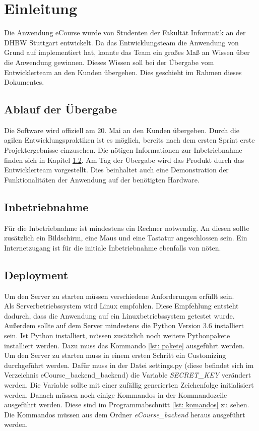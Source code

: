 
\chapter{Einleitung}

Die Anwendung eCourse wurde von Studenten der Fakultät Informatik an der DHBW Stuttgart entwickelt. Da das Entwicklungsteam die Anwendung von Grund auf implementiert hat, konnte das Team ein großes Maß an Wissen über die Anwendung gewinnen. Dieses Wissen soll bei der Übergabe vom Entwicklerteam an den Kunden übergehen. Dies geschieht im Rahmen dieses Dokumentes. 

\section{Ablauf der Übergabe}
Die Software wird offiziell am 20. Mai an den Kunden übergeben. Durch die agilen Entwicklungspraktiken ist es möglich, bereits nach dem ersten Sprint erste Projektergebnisse einzusehen. Die nötigen Informationen zur Inbetriebnahme finden sich in Kapitel \ref{sec:inbetrieb}.
Am Tag der Übergabe wird das Produkt durch das Entwicklerteam vorgestellt. Dies beinhaltet auch eine Demonstration der Funktionalitäten der Anwendung auf der benötigten Hardware.

\section{Inbetriebnahme}
\label{sec:inbetrieb}
Für die Inbetriebnahme ist mindestens ein Rechner notwendig. An diesen sollte zusätzlich ein Bildschirm, eine Maus und eine Tastatur angeschlossen sein. Ein Internetzugang ist für die initiale Inbetriebnahme ebenfalls von nöten.

\section{Deployment}
Um den Server zu starten müssen verschiedene Anforderungen erfüllt sein. \\
Als Serverbetriebssystem wird Linux empfohlen. Diese Empfehlung entsteht dadurch, dass die Anwendung auf ein Linuxbetriebssystem getestet wurde.
Außerdem sollte auf dem Server mindestens die Python Version 3.6 installiert sein. Ist Python installiert, müssen zusätzlich noch weitere Pythonpakete installiert werden. Dazu muss das Kommando \ref{lst: pakete} ausgeführt werden. 
Um den Server zu starten muss in einem ersten Schritt ein Customizing durchgeführt werden. Dafür muss in der Datei \glqq settings.py\grqq\; (diese befindet sich im Verzeichnis \glqq eCourse\_backend\eCourse\_backend\grqq ) die Variable \textit{SECRET\_KEY} verändert werden. Die Variable sollte mit einer zufällig generierten Zeichenfolge initialisiert werden. 
Danach müssen noch einige Kommandos in der Kommandozeile ausgeführt werden. Diese sind im Programmabschnitt \ref{lst: komandos} zu sehen. Die Kommandos müssen aus dem Ordner \textit{eCourse\_backend} heraus ausgeführt werden. \\

